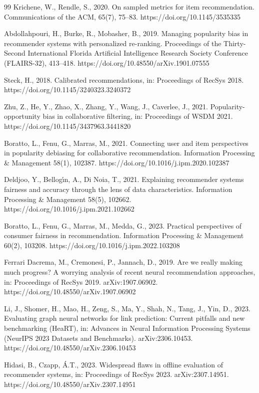 \documentclass[preprint,12pt]{elsarticle}
\begin{document}
\begin{thebibliography}{99}
Krichene, W., Rendle, S., 2020. On sampled metrics for item recommendation. Communications of the ACM, 65(7), 75–83. https://doi.org/10.1145/3535335

Abdollahpouri, H., Burke, R., Mobasher, B., 2019. Managing popularity bias in recommender systems with personalized re-ranking. Proceedings of the Thirty-Second International Florida Artificial Intelligence Research Society Conference (FLAIRS-32), 413–418. https://doi.org/10.48550/arXiv.1901.07555

Steck, H., 2018. Calibrated recommendations, in: Proceedings of RecSys 2018. https://doi.org/10.1145/3240323.3240372

Zhu, Z., He, Y., Zhao, X., Zhang, Y., Wang, J., Caverlee, J., 2021. Popularity-opportunity bias in collaborative filtering, in: Proceedings of WSDM 2021. https://doi.org/10.1145/3437963.3441820

Boratto, L., Fenu, G., Marras, M., 2021. Connecting user and item perspectives in popularity debiasing for collaborative recommendation. Information Processing \& Management 58(1), 102387. https://doi.org/10.1016/j.ipm.2020.102387

Deldjoo, Y., Bellog\'{\i}n, A., Di Noia, T., 2021. Explaining recommender systems fairness and accuracy through the lens of data characteristics. Information Processing \& Management 58(5), 102662. https://doi.org/10.1016/j.ipm.2021.102662

Boratto, L., Fenu, G., Marras, M., Medda, G., 2023. Practical perspectives of consumer fairness in recommendation. Information Processing \& Management 60(2), 103208. https://doi.org/10.1016/j.ipm.2022.103208

Ferrari Dacrema, M., Cremonesi, P., Jannach, D., 2019. Are we really making much progress? A worrying analysis of recent neural recommendation approaches, in: Proceedings of RecSys 2019. arXiv:1907.06902. https://doi.org/10.48550/arXiv.1907.06902

Li, J., Shomer, H., Mao, H., Zeng, S., Ma, Y., Shah, N., Tang, J., Yin, D., 2023. Evaluating graph neural networks for link prediction: Current pitfalls and new benchmarking (HeaRT), in: Advances in Neural Information Processing Systems (NeurIPS 2023 Datasets and Benchmarks). arXiv:2306.10453. https://doi.org/10.48550/arXiv.2306.10453

Hidasi, B., Czapp, \'{A}.T., 2023. Widespread flaws in offline evaluation of recommender systems, in: Proceedings of RecSys 2023. arXiv:2307.14951. https://doi.org/10.48550/arXiv.2307.14951


\end{thebibliography}
\end{document}
